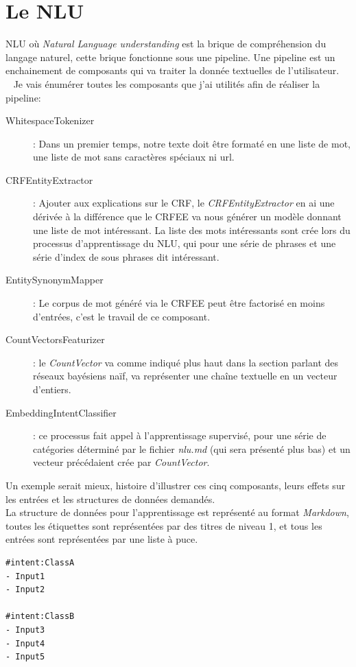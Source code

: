 \section{Le NLU}
NLU où \textit{Natural Language understanding} est la brique de compréhension du langage naturel, cette brique fonctionne sous une pipeline. Une pipeline est un enchainement de composants qui va traiter la donnée textuelles de l'utilisateur.\\
\ \linebreak
Je vais énumérer toutes les composants que j'ai utilités afin de réaliser la pipeline:
\begin{description}
\item[WhitespaceTokenizer]: Dans un premier temps, notre texte doit être formaté en une liste de mot, une liste de mot sans caractères spéciaux ni url.
\item[CRFEntityExtractor]: Ajouter aux explications sur le CRF, le \textit{CRFEntityExtractor} en ai une dérivée à la différence que le CRFEE va nous générer un modèle donnant une liste de mot intéressant. La liste des mots intéressants sont crée lors du processus d'apprentissage du NLU, qui pour une série de phrases et une série d'index de sous phrases dit intéressant.
\item[EntitySynonymMapper]: Le corpus de mot généré via le CRFEE peut être factorisé en moins d'entrées, c'est le travail de ce composant.
\item[CountVectorsFeaturizer]: le \textit{CountVector} va comme indiqué plus haut dans la section parlant des réseaux bayésiens naïf, va représenter une chaîne textuelle en un vecteur d'entiers.
\item[EmbeddingIntentClassifier]: ce processus fait appel à l'apprentissage supervisé, pour une série de catégories déterminé par le fichier \textit{nlu.md} (qui sera présenté plus bas) et un vecteur précédaient crée par \textit{CountVector}.
\end{description}

\pagebreak

Un exemple serait mieux, histoire d'illustrer ces cinq composants, leurs effets sur les entrées et les structures de données demandés.\\
La structure de données pour l'apprentissage est représenté au format \textit{Markdown}, toutes les étiquettes sont représentées par des titres de niveau 1, et tous les entrées sont représentées par une liste à puce.\\

\begin{lstlisting}
#intent:ClassA
- Input1
- Input2

#intent:ClassB
- Input3
- Input4
- Input5
\end{lstlisting}

